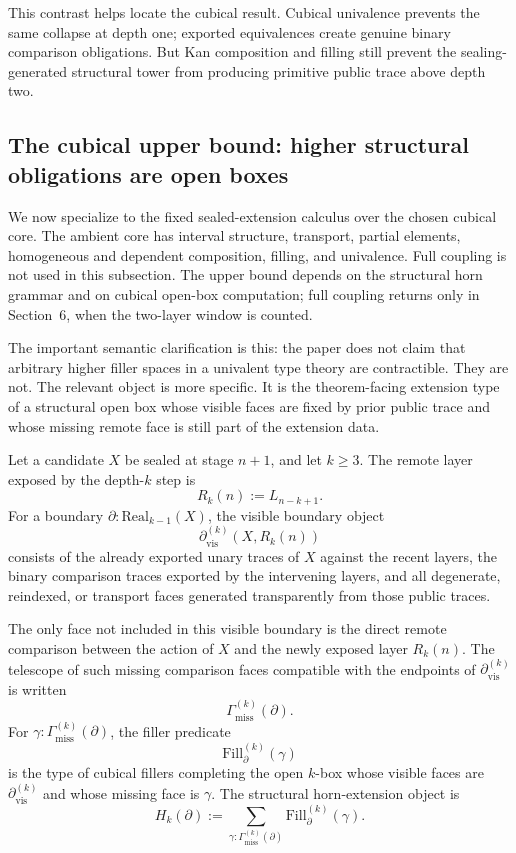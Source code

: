 This contrast helps locate the cubical result.  Cubical univalence prevents the same collapse
at depth one; exported equivalences create genuine binary comparison obligations.  But Kan
composition and filling still prevent the sealing-generated structural tower from producing
primitive public trace above depth two.

\subsection{The cubical upper bound: higher structural obligations are open boxes}
\label{subsec:cubical-upper-bound}

We now specialize to the fixed sealed-extension calculus over the chosen cubical core.  The
ambient core has interval structure, transport, partial elements, homogeneous and dependent
composition, filling, and univalence.  Full coupling is not used in this subsection.  The
upper bound depends on the structural horn grammar and on cubical open-box computation;
full coupling returns only in Section~6, when the two-layer window is counted.

The important semantic clarification is this: the paper does not claim that arbitrary higher
filler spaces in a univalent type theory are contractible.  They are not.  The relevant object
is more specific.  It is the theorem-facing extension type of a structural open box whose
visible faces are fixed by prior public trace and whose missing remote face is still part of
the extension data.

\begin{definition}
\label{def:structural-horn-package}
Let a candidate \(X\) be sealed at stage \(n+1\), and let \(k\geq 3\).  The remote layer
exposed by the depth-\(k\) step is
\[
  R_k(n) := L_{n-k+1}.
\]
For a boundary \(\partial : \mathrm{Real}_{k-1}(X)\), the visible boundary object
\[
  \partial_{\mathrm{vis}}^{(k)}(X,R_k(n))
\]
consists of the already exported unary traces of \(X\) against the recent layers, the binary
comparison traces exported by the intervening layers, and all degenerate, reindexed, or
transport faces generated transparently from those public traces.

The only face not included in this visible boundary is the direct remote comparison between
the action of \(X\) and the newly exposed layer \(R_k(n)\).  The telescope of such missing
comparison faces compatible with the endpoints of \(\partial_{\mathrm{vis}}^{(k)}\) is written
\[
  \Gamma_{\mathrm{miss}}^{(k)}(\partial).
\]
For \(\gamma:\Gamma_{\mathrm{miss}}^{(k)}(\partial)\), the filler predicate
\[
  \mathrm{Fill}^{(k)}_{\partial}(\gamma)
\]
is the type of cubical fillers completing the open \(k\)-box whose visible faces are
\(\partial_{\mathrm{vis}}^{(k)}\) and whose missing face is \(\gamma\).  The structural
horn-extension object is
\[
  H_k(\partial)
  :=
  \sum_{\gamma:\Gamma_{\mathrm{miss}}^{(k)}(\partial)}
  \mathrm{Fill}^{(k)}_{\partial}(\gamma).
\]
\end{definition}


